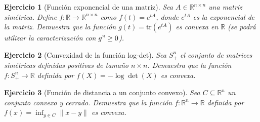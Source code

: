 \documentclass[11pt]{report}
\newtheorem{ex}{Ejercicio}
\newenvironment{solucion}{\color{blue}\textbf{Solución:}}{}
\begin{document}
\begin{ex}[Función exponencial de una matriz]
    Sea $A \in \mathbb{R}^{n \times n}$ una matriz simétrica. Define $f: \mathbb{R} \to \mathbb{R}^{n \times n}$ como $f(t) = e^{tA}$, donde $e^{tA}$ es la exponencial de la matriz. Demuestra que la función $g(t) = \text{tr}(e^{tA})$ es convexa en $\mathbb{R}$
    (se podrá utilizar la caracterización con $g"\geq0$).
\end{ex}



\begin{ex}[Convexidad de la función log-det]
    Sea $S^n_+$ el conjunto de matrices simétricas definidas positivas de tamaño $n \times n$. Demuestra que la función $f: S^n_+ \to \mathbb{R}$ definida por $f(X) = -\log \det(X)$ es convexa.
\end{ex}



\begin{ex}[Función de distancia a un conjunto convexo]
    Sea $C \subseteq \mathbb{R}^n$ un conjunto convexo y cerrado. Demuestra que la función $f: \mathbb{R}^n \to \mathbb{R}$ definida por $f(x) = \inf_{y \in C} \|x - y\|$ es convexa.
\end{ex}
\end{document}
